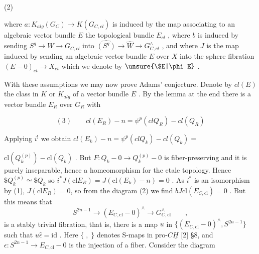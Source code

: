 (2)

where $a:K_{alg}(G_C) \to K(G_{C,cl})$ is induced by the map associating to
an algebraic vector bundle $E$ the topological bundle $E_{cl}$ , where
$b$ is induced by sending $S^q \to W \to G_{C,cl}$ into $\widehat{(S^q)} \to \hat{W} \to G^{\wedge}_{C,cl}$ ,
and where $J$ is the map induced by sending an algebraic vector
bundle $E$ over $X$ into the sphere fibration $(E - 0)_{et} \to X_{et}$
which we denote by $\unsure{\$E|\phi E}$ .

With these assumptions we may now prove Adams' conjecture.
Denote by $cl(E)$ the class in $K$ or $K_{alg}$ of a vector bundle $E$ .
By the lemma at the end there is a vector bundle $E_R$ over $G_R$ with

\[ (3) \qquad cl(E_R) - n = \psi^p(clQ_R) - cl(Q_R) \]

Applying $i^!$ we obtain $cl(E_k) - n = \psi^p(clQ_k) - cl(Q_k) =$



$\mathrm{cl}(Q_k^{(p)}) - \mathrm{cl}(Q_k)$ .  But  $F:Q_k - 0 \to Q_k^{(p)} - 0$  is fiber-preserving
and it is purely inseparable, hence a homeomorphism for the etale
topology.  Hence  $\$Q_k^{(p)} \simeq \$Q_k$  so  $i^*J(\mathrm{cl}E_R) = J(\mathrm{cl}(E_k) - n) = 0$ .
As  $i^*$ is an isomorphism by (1), $J(\mathrm{cl}E_R) = 0$, so from the diagram
(2) we find  $bJ\mathrm{cl}(E_{C,\mathrm{cl}}) = 0$ .  But this means that
\[ S^{2n-1} \to (E_{C,\mathrm{cl}} - 0)^{\wedge} \to G^{\wedge}_{C,\mathrm{cl}} \qquad , \]
is a stably trivial fibration, that is, there is a map  $u$  in
$\{(E_{C,\mathrm{cl}} - 0)^{\wedge} , S^{2n-1}\}$  such that  $u\hat{\epsilon} = \mathrm{id}$ .  Here  $\{ \; , \; \}$  denotes
S-maps in pro-$C\underline{H}$  [2] §8, and  $\epsilon:S^{2n-1} \to E_{C,\mathrm{cl}} - 0$  is the injection
of a fiber.  Consider the diagram

